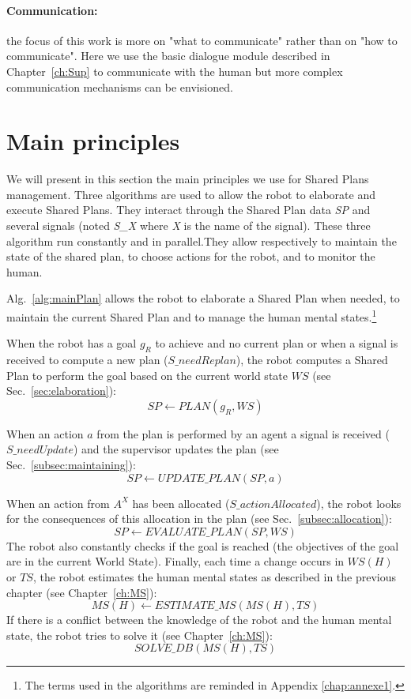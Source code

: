 \documentclass[english,a4paper,11pt,twoside]{StyleThese}
\begin{document}
\paragraph{Communication:} the focus of this work is more on "what to communicate" rather than on "how to communicate". Here we use the basic dialogue module described in Chapter~\ref{ch:Sup} to communicate with the human but more complex communication mechanisms can be envisioned. 

\section{Main principles}

We will present in this section the main principles we use for Shared Plans management. Three algorithms are used to allow the robot to elaborate and execute Shared Plans.  They interact through the Shared Plan data \textit{SP} and several signals (noted \textit{S\_X} where \textit{X} is the name of the signal). These three algorithm run constantly and in parallel.They allow respectively to maintain the state of the shared plan, to choose actions for the robot, and to monitor the human.

Alg.~\ref{alg:mainPlan} allows the robot to elaborate a Shared Plan when needed, to maintain the current Shared Plan and to manage the human mental states.\footnote{The terms used in the algorithms are reminded in Appendix \ref{chap:annexe1}.}


When the robot has a goal $g_R$ to achieve and no current plan or when a signal is received to compute a new plan ($S\_needReplan$), the robot computes a Shared Plan to perform the goal based on the current world state $WS$ (see Sec.~\ref{sec:elaboration}):
$$SP \leftarrow PLAN(g_R, WS)$$

When an action $a$ from the plan is performed by an agent a signal is received ($S\_needUpdate$) and the supervisor updates the plan (see Sec.~\ref{subsec:maintaining}):
$$SP \leftarrow UPDATE\_PLAN(SP, a)$$

When an action from $A^X$ has been allocated ($S\_actionAllocated$), the robot looks for the consequences of this allocation in the plan (see Sec.~\ref{subsec:allocation}):
$$SP \leftarrow EVALUATE\_ PLAN(SP, WS)$$
The robot also constantly checks if the goal is reached (the objectives of the goal are in the current World State).
Finally, each time a change occurs in $WS(H)$ or $TS$, the robot estimates the human mental states as described in the previous chapter (see Chapter~\ref{ch:MS}):
$$MS(H) \leftarrow ESTIMATE\_MS(MS(H), TS)$$
If there is a conflict between the knowledge of the robot and the human mental state, the robot tries to solve it (see Chapter~\ref{ch:MS}): 
$$SOLVE\_DB(MS(H), TS)$$
\end{document}
